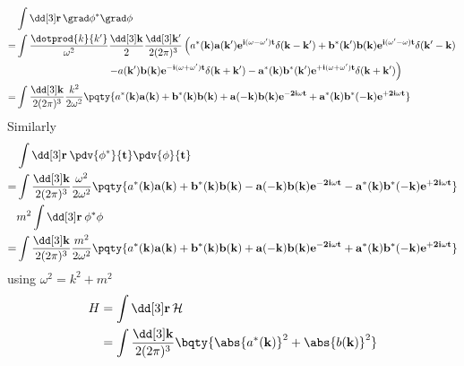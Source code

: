 \documentclass[12pt]{article}
\begin{document}
            \begin{align*}
                &\int \dd[3] \bf r\,  \grad \phi^* \grad \phi\\ 
                = &\int \frac{\dotprod{k}{k'}}{\omega^2}\frac{\dd[3] \bf k}{2} \frac{\dd[3] \bf k'}{2 (2\pi)^3}\left(a^*(\bf k) a(\bf k')e^{i(\omega - \omega ')t}\delta(\bf{k - k'})+ b^*(\bf k')b(\bf k)e^{i(\omega' - \omega)t}\delta(\bf{k' - k}) \right.\\
                &\qquad\qquad\qquad\qquad\quad\left. - a(\bf k')b(\bf k)e^{ -i(\omega + \omega ')t}\delta(\bf{k + k'})-a^*(\bf k)b^*(\bf k')e^{ +i(\omega + \omega ')t}\delta(\bf{k + k'})\right)\\
                = &\int \frac{\dd[3]\bf k}{2 (2\pi)^3} \frac{k^2}{2\omega^2} \pqty{a^*(\bf k)a(\bf k)+ b^*(\bf k)b(\bf k) + a( -\bf k)b(\bf k)e^{ - 2i\omega t } +a^*(\bf k)b^*( -\bf k)e^{ + 2i\omega t}} 
            \end{align*}
            Similarly
            \begin{align*}
                &\int \dd[3] \bf r\: \pdv{\phi^*}{t}\pdv{\phi}{t}\\ 
                = &\int \frac{\dd[3]\bf k}{2 (2\pi)^3} \frac{\omega^2}{2\omega^2} \pqty{a^*(\bf k)a(\bf k)+ b^*(\bf k)b(\bf k) - a( -\bf k)b(\bf k)e^{ - 2i\omega t } -a^*(\bf k)b^*( -\bf k)e^{ + 2i\omega t}}\\
                &m^2\int \dd[3] \bf r\: \phi^*\phi \\ 
                = &\int \frac{\dd[3]\bf k}{2 (2\pi)^3} \frac{m^2}{2\omega^2} \pqty{a^*(\bf k)a(\bf k)+ b^*(\bf k)b(\bf k) + a( -\bf k)b(\bf k)e^{ - 2i\omega t } +a^*(\bf k)b^*( -\bf k)e^{ + 2i\omega t}} 
            \end{align*}
            using \(\omega^2 = k^2 + m^2\)
            \begin{align*}
                H &= \int \dd[3] \bf r\, \mathcal{H}\\
                &= \int \frac{\dd[3]\bf k}{2 (2\pi)^3}\bqty{\abs{a^*(\bf k)}^2 +\abs{b(\bf k)}^2 }
            \end{align*}
\end{document}
